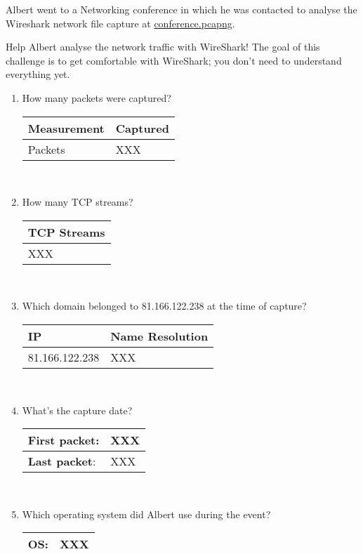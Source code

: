 \documentclass{article}
\begin{document}

\noindent
Albert went to a Networking conference in which he was contacted to analyse the Wireshark network
file capture at \href{https://github.com/ncatanoc/redes\_algarve/blob/main/labs/lab02/conference.pcapng}{conference.pcapng}.

\bigskip

\noindent Help Albert analyse the network traffic with WireShark! The goal of this challenge is
  to get comfortable with WireShark; you don't need to understand everything yet.
  
\begin{enumerate}[1.]
\item How many packets were captured?   \\
  \begin{tabular}{|l|l|}\hline
    {\bf{}Measurement} &  {\bf{}Captured} \\ \hline
    Packets & XXX \\ \hline
  \end{tabular}\\
\item How many TCP streams? \\
  \begin{tabular}{|l|}\hline
    {\bf{}TCP Streams} \\ \hline
    XXX \\ \hline
  \end{tabular}\\
\item Which domain belonged to 81.166.122.238 at the time of capture?  \\
  \begin{tabular}{|l|l|}\hline
    {\bf{}IP} &  {\bf{}Name Resolution} \\ \hline
    81.166.122.238 & XXX \\ \hline
  \end{tabular}\\
  
\item What's the capture date?  \\  
  \begin{tabular}{|l|l|}\hline
    {\bf{}First packet}: & XXX \\ \hline
    {\bf{}Last packet}:  & XXX \\ \hline
  \end{tabular}\\  
\item Which operating system did Albert use during the event?  \\
  \begin{tabular}{|l|l|}\hline
    {\bf{}OS}: & XXX \\ \hline
  \end{tabular}
  
\end{enumerate}
\end{document}
